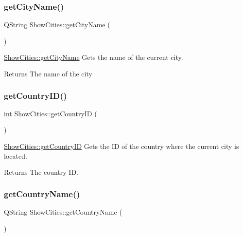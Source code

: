 \subsubsection{\texorpdfstring{get\+City\+Name()}{getCityName()}}
{\footnotesize\ttfamily Q\+String Show\+Cities\+::get\+City\+Name (\begin{DoxyParamCaption}{ }\end{DoxyParamCaption})}



\mbox{\hyperlink{class_show_cities_a3640b91c66939d0070c3dd6f5b9eb93c}{Show\+Cities\+::get\+City\+Name}} Gets the name of the current city. 

\begin{DoxyReturn}{Returns}
The name of the city 
\end{DoxyReturn}
\mbox{\label{class_show_cities_a8f66380734928e926a732a0088c1d998}} 
\subsubsection{\texorpdfstring{get\+Country\+I\+D()}{getCountryID()}}
{\footnotesize\ttfamily int Show\+Cities\+::get\+Country\+ID (\begin{DoxyParamCaption}{ }\end{DoxyParamCaption})}



\mbox{\hyperlink{class_show_cities_a8f66380734928e926a732a0088c1d998}{Show\+Cities\+::get\+Country\+ID}} Gets the ID of the country where the current city is located. 

\begin{DoxyReturn}{Returns}
The country ID. 
\end{DoxyReturn}
\mbox{\label{class_show_cities_a93cf32e7ef19a182d0022c9c888392aa}} 
\subsubsection{\texorpdfstring{get\+Country\+Name()}{getCountryName()}}
{\footnotesize\ttfamily Q\+String Show\+Cities\+::get\+Country\+Name (\begin{DoxyParamCaption}{ }\end{DoxyParamCaption})}



